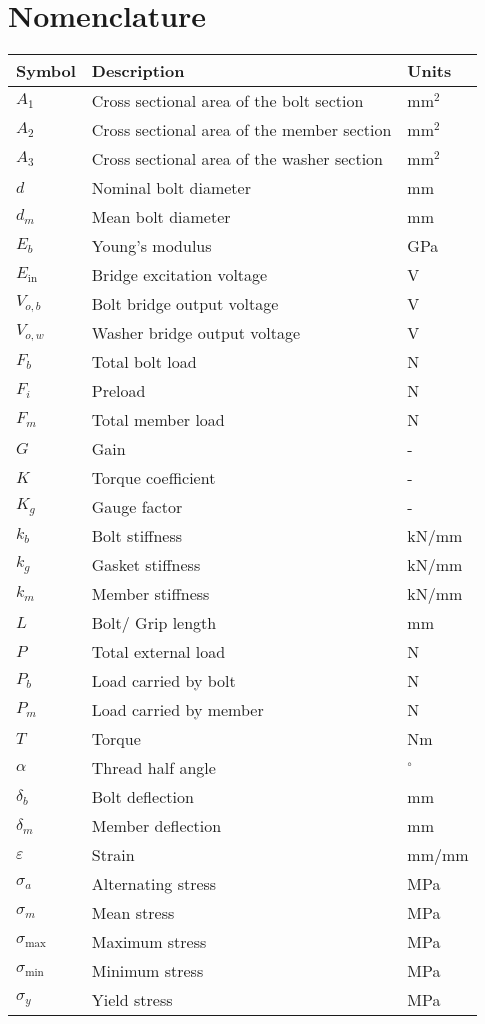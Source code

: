 \section{Nomenclature}  
\begin{longtable}{l l l}
    \toprule
    Symbol & Description & Units \\
    \midrule
    $A_1$ & Cross sectional area of the bolt section & mm$^2$ \\
    $A_2$ & Cross sectional area of the member section & mm$^2$ \\
    $A_3$ & Cross sectional area of the washer section & mm$^2$ \\
    $d$ & Nominal bolt diameter & mm \\
    $d_m$ & Mean bolt diameter & mm \\
    $E_b$ & Young's modulus & GPa \\
    $E_{\text{in}}$ & Bridge excitation voltage & V \\
    $V_{o, b}$ & Bolt bridge output voltage & V \\
    $V_{o, w}$ & Washer bridge output voltage & V \\
    $F_b$ & Total bolt load & N \\
    $F_i$ & Preload & N \\
    $F_m$ & Total member load & N \\
    $G$ & Gain & - \\
    $K$ & Torque coefficient & - \\
    $K_g$ & Gauge factor & - \\
    $k_b$ & Bolt stiffness & kN/mm \\
    $k_g$ & Gasket stiffness & kN/mm \\
    $k_m$ & Member stiffness & kN/mm \\
    $L$ & Bolt/ Grip length & mm \\
    $P$ & Total external load & N \\
    $P_b$ & Load carried by bolt & N \\
    $P_m$ & Load carried by member & N \\
    $T$ & Torque & Nm \\
    $\alpha$ & Thread half angle & $^\circ$ \\
    $\delta_b$ & Bolt deflection & mm \\
    $\delta_m$ & Member deflection & mm \\
    $\varepsilon$ & Strain & mm/mm \\
    $\sigma_a$ & Alternating stress & MPa \\
    $\sigma_m$ & Mean stress & MPa \\
    $\sigma_{\text{max}}$ & Maximum stress & MPa \\
    $\sigma_{\text{min}}$ & Minimum stress & MPa \\
    $\sigma_y$ & Yield stress & MPa \\
    \bottomrule
\end{longtable}